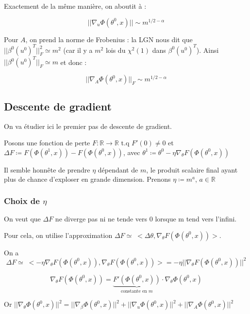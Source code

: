 \documentclass[a4paper, 11pt, french]{article}
\theoremstyle{definition}
\begin{document}
	 Exactement de la même manière, on aboutit à :
	 
	 \[||\nabla_u \Phi (\theta^0, x)|| \sim m^{1/2 - \alpha}\]
	 
	 Pour $A$, on prend la norme de Frobenius : la LGN nous dit que $||\beta^0 (u^0)^T||_F^2 \simeq m^2 $ (car il y a $m^2$ lois du $\chi^2(1)$ dans $\beta^0 (u^0)^T$). Ainsi $||\beta^0 (u^0)^T||_F \simeq m$ et donc :
	 
	 \[||\nabla_A \Phi (\theta^0, x)||_F \sim m^{1/2 - \alpha}\]
	 
	 \subsection{Descente de gradient}
	 
	 On va étudier ici le premier pas de descente de gradient.
	 
	 Posons une fonction de perte $F : \mathbb{R} \rightarrow \mathbb{R}$ t.q $F'(0) \neq 0$ et 
	 $\Delta F \coloneqq F(\Phi(\theta^1, x)) - F(\Phi(\theta^0, x))$, avec 
	 $\theta^1 \coloneqq \theta^0 - \eta \nabla_{\theta} F(\Phi(\theta^0, x))$
	 
	 Il semble honnête de prendre $\eta$ dépendant de $m$, le produit scalaire final ayant plus de chance d'exploser en grande dimension. Prenons $\eta \coloneqq m^a$, $a \in \mathbb{R}$ \\
	 
	 \subsubsection{Choix de $\eta$}
	 
	 On veut que $\Delta F$ ne diverge pas ni ne tende vers 0 lorsque m tend vers l'infini.
	 
	 Pour cela, on utilise l'approximation 
	 $\Delta F \simeq \; < \Delta \theta, \nabla_{\theta} F(\Phi(\theta^0, x)) >$.
	 
	 On a 
	 \[
	 \Delta F \simeq \; < -\eta \nabla_{\theta} F(\Phi(\theta^0, x)) , \nabla_{\theta} F(\Phi(\theta^0, x)) > = -\eta || \nabla_{\theta} F(\Phi(\theta^0, x)) ||^2
	 \]
	 
	 \[
	 \nabla_{\theta} F(\Phi(\theta^0, x)) = 
	 \underbrace{F'(\Phi(\theta^0, x))}_\text{constante en $m$} 
	 \cdot \nabla_{\theta} \Phi(\theta^0, x)
	 \]
	 
	 Or $ || \nabla_{\theta} \Phi(\theta^0, x) ||^2 = || \nabla_{\beta} \Phi(\theta^0, x) ||^2 + || \nabla_{u} \Phi(\theta^0, x) ||^2 + || \nabla_{A} \Phi(\theta^0, x) ||^2$ \\
	 
\end{document}
